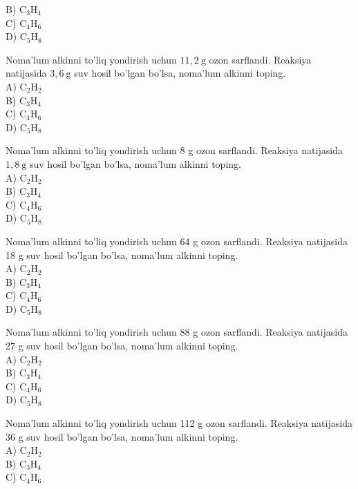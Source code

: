 B) $\mathrm{C}_{3} \mathrm{H}_{4}$\\
C) $\mathrm{C}_{4} \mathrm{H}_{6}$\\
D) $\mathrm{C}_{5} \mathrm{H}_{8}$
  \item Noma'lum alkinni to'liq yondirish uchun $11,2 \mathrm{~g}$ ozon sarflandi. Reaksiya natijasida $3,6 \mathrm{~g}$ suv hosil bo'lgan bo'lsa, noma'lum alkinni toping.\\
A) $\mathrm{C}_{2} \mathrm{H}_{2}$\\
B) $\mathrm{C}_{3} \mathrm{H}_{4}$\\
C) $\mathrm{C}_{4} \mathrm{H}_{6}$\\
D) $\mathrm{C}_{5} \mathrm{H}_{8}$
  \item Noma'lum alkinni to'liq yondirish uchun 8 g ozon sarflandi. Reaksiya natijasida $1,8 \mathrm{~g}$ suv hosil bo'lgan bo'lsa, noma'lum alkinni toping.\\
A) $\mathrm{C}_{2} \mathrm{H}_{2}$\\
B) $\mathrm{C}_{3} \mathrm{H}_{4}$\\
C) $\mathrm{C}_{4} \mathrm{H}_{6}$\\
D) $\mathrm{C}_{5} \mathrm{H}_{8}$
  \item Noma'lum alkinni to'liq yondirish uchun 64 g ozon sarflandi. Reaksiya natijasida 18 g suv hosil bo'lgan bo'lsa, noma'lum alkinni toping.\\
A) $\mathrm{C}_{2} \mathrm{H}_{2}$\\
B) $\mathrm{C}_{3} \mathrm{H}_{4}$\\
C) $\mathrm{C}_{4} \mathrm{H}_{6}$\\
D) $\mathrm{C}_{5} \mathrm{H}_{8}$
  \item Noma'lum alkinni to'liq yondirish uchun 88 g ozon sarflandi. Reaksiya natijasida 27 g suv hosil bo'lgan bo'lsa, noma'lum alkinni toping.\\
A) $\mathrm{C}_{2} \mathrm{H}_{2}$\\
B) $\mathrm{C}_{3} \mathrm{H}_{4}$\\
C) $\mathrm{C}_{4} \mathrm{H}_{6}$\\
D) $\mathrm{C}_{5} \mathrm{H}_{8}$
  \item Noma'lum alkinni to'liq yondirish uchun 112 g ozon sarflandi. Reaksiya natijasida 36 g suv hosil bo'lgan bo'lsa, noma'lum alkinni toping.\\
A) $\mathrm{C}_{2} \mathrm{H}_{2}$\\
B) $\mathrm{C}_{3} \mathrm{H}_{4}$\\
C) $\mathrm{C}_{4} \mathrm{H}_{6}$\\
